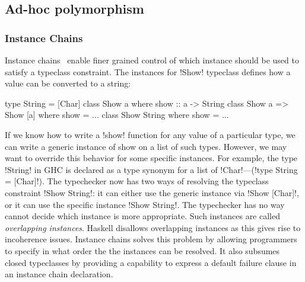 \documentclass[screen,nonacm,manuscript,review]{acmart} %
\begin{document}
\subsection{Ad-hoc polymorphism}\label{sec:rw-adhoc-poly}

\subsubsection{Instance Chains}
Instance chains~\cite{morris_instance_2010} enable finer grained
control of which instance should be used to satisfy
a typeclass constraint. The instances for !Show! typeclass defines how
a value can be converted to a string:

\begin{CenteredBox}
\begin{code}
type String = [Char]
class Show a where show :: a -> String
class Show a => Show [a] where show = ...
class Show String where show = ...
\end{code}
\end{CenteredBox}
If we know how to write a !show! function for any value of a particular
type, we can write a generic instance of show on a list of such types.
However, we may want to override this behavior for some specific
instances. For example, the type !String! in GHC is declared as a
type synonym for a list of !Char!---(!type String = [Char]!).
The typechecker now has two ways of resolving the typeclass
constraint !Show String!: it can either use the generic instance via
!Show [Char]!, or it can use the specific instance !Show String!. The
typechecker has no way cannot decide which instance is more appropriate.
Such instances are called \emph{overlapping instances}.
Haskell disallows overlapping instances as this gives rise to
incoherence issues\cite{jones_coherence_1993}.
Instance chains solves this problem by allowing programmers
to specify in what order the the instances can be resolved. It also
subsumes closed typeclasses by providing a capability to express
a default failure clause in an instance chain declaration.
\end{document}
